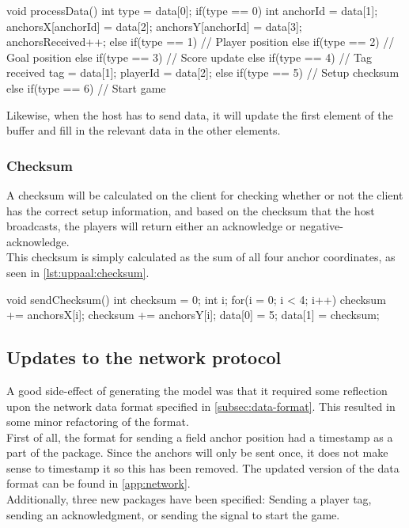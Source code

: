 \begin{uppaalcode}[caption={Processing Data in \uppaal model}, captionpos=b,label={lst:uppaal:processData},numbers=left]
void processData(){
    int type = data[0];
    if(type == 0){
        int anchorId = data[1];
        anchorsX[anchorId] = data[2];
        anchorsY[anchorId] = data[3];
        anchorsReceived++;
    } else if(type == 1){
        // Player position
    } else if(type == 2){
        // Goal position
    } else if(type == 3){
        // Score update
    } else if(type == 4){
        // Tag received
        tag = data[1];
        playerId = data[2];
    } else if(type == 5){
        // Setup checksum
    } else if(type == 6){
        // Start game
    }
}
\end{uppaalcode}
\noindent
Likewise, when the host has to send data, it will update the first element of the buffer and fill in the relevant data in the other elements.

\subsubsection{Checksum}
A checksum will be calculated on the client for checking whether or not the client has the correct setup information, and based on the checksum that the host broadcasts, the players will return either an acknowledge or negative-acknowledge.
\\
This checksum is simply calculated as the sum of all four anchor coordinates, as seen in \autoref{lst:uppaal:checksum}.

\begin{uppaalcode}[caption={Calculating checksum in \uppaal model}, captionpos=b,label={lst:uppaal:checksum}]
void sendChecksum(){
    int checksum = 0;
    int i;
    for(i = 0; i < 4; i++){
        checksum += anchorsX[i];
        checksum += anchorsY[i];
    }
    data[0] = 5;
    data[1] = checksum;   
}
\end{uppaalcode}

\subsection{Updates to the network protocol}\label{subsec:sprint3networkupdate}
A good side-effect of generating the \uppaal model was that it required some reflection upon the network data format specified in \autoref{subsec:data-format}.
This resulted in some minor refactoring of the format.
\\
First of all, the format for sending a field anchor position had a timestamp as a part of the package.
Since the anchors will only be sent once, it does not make sense to timestamp it so this has been removed.
The updated version of the data format can be found in \autoref{app:network}.
\\
Additionally, three new packages have been specified: Sending a player tag, sending an acknowledgment, or sending the signal to start the game.

